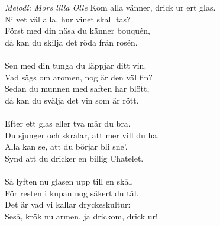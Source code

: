 {\footnotesize\textit{Melodi: Mors lilla Olle}}
\vspace{10pt}
Kom alla vänner, drick ur ert glas.\\
Ni vet väl alla, hur vinet skall tas?\\
Först med din näsa du känner bouquén,\\
då kan du skilja det röda från rosén.\\
\\
Sen med din tunga du läppjar ditt vin.\\
Vad sägs om aromen, nog är den väl fin?\\
Sedan du munnen med saften har blött,\\
då kan du svälja det vin som är rött.\\
\\
Efter ett glas eller två mår du bra.\\
Du sjunger och skrålar, att mer vill du ha.\\
Alla kan se, att du börjar bli sne'.\\
Synd att du dricker en billig Chatelet.\\
\\
Så lyften nu glasen upp till en skål.\\
För resten i kupan nog säkert du tål.\\
Det är vad vi kallar dryckeskultur:\\
Seså, krök nu armen, ja drickom, drick ur!
